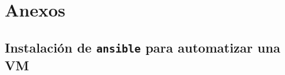 \documentclass[12pt]{article}
\begin{document}
	\pagebreak
	
	\appendix
	
	\section{Anexos}
	
	\subsection{Instalación de \texttt{ansible} para automatizar una VM}
	
\end{document}
